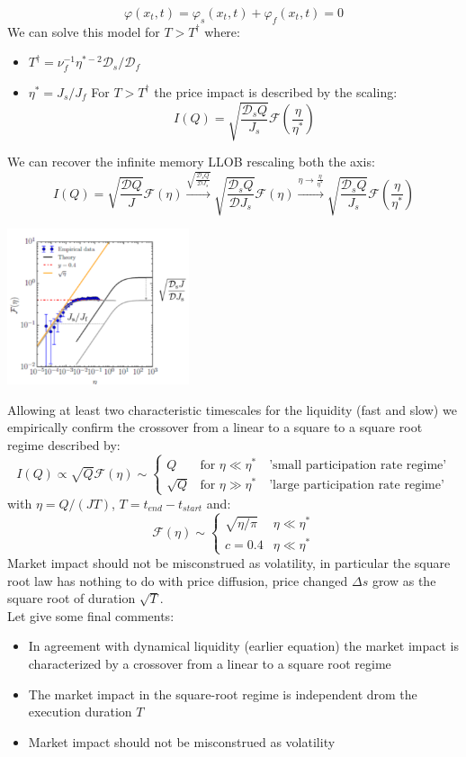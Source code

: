 \[
\varphi(x_t,t) = \varphi_s(x_t,t) + \varphi_f(x_t,t) = 0
\]
We can solve this model for $T > T^\dag$ where:
\begin{itemize}
	\item $T^\dag = \nu_f^{-1}\eta^{*-2}\mathcal{D}_s/\mathcal{D}_f$
	\item $\eta^* = J_s/J_f$
For $T > T^\dagger$ the price impact is described by the scaling:
\[
I(Q) = \sqrt{\frac{\mathcal{D}_sQ}{J_s}}\mathcal{F}\left(\frac{\eta}{\eta^*}\right)
\]
\end{itemize}
We can recover the infinite memory LLOB rescaling both the axis:
\[
I(Q) = \sqrt{\frac{\mathcal{D}Q}{J}} \mathcal{F}(\eta) \xrightarrow[]{\sqrt{\frac{\mathcal{D}_sQ}{\mathcal{D}J_s}}}\sqrt{\frac{\mathcal{D}_sQ}{\mathcal{D}J_s}} \mathcal{F}(\eta)\xrightarrow[]{\eta \to \frac{\eta}{\eta^*}} \sqrt{\frac{\mathcal{D}_sQ}{J_s}} \mathcal{F}\left(\frac{\eta}{\eta^*}\right)
\]
\begin{center}
	\includegraphics[width=0.4\textwidth]{picture/(37)fast_slow_llob.png}
\end{center}
Allowing at least two characteristic timescales for the liquidity (fast and slow) we empirically confirm the crossover from a linear to a square to a square root regime described by:
\[
I(Q) \propto \sqrt{Q} \mathcal{F}(\eta)\sim \begin{cases}
	Q & \text{for } \eta \ll \eta^* \quad \text{'small participation rate regime'}\\
	\sqrt{Q} & \text{for } \eta \gg \eta^* \quad \text{'large participation rate regime'}
\end{cases}
\]
with $\eta = Q/(JT)$, $T =t_{end} - t_{start}$ and:
\[
\mathcal{F}(\eta) \sim \begin{cases}
	\sqrt{\eta/\pi} & \eta \ll \eta^*\\
	c = 0.4 & \eta \ll \eta^*
\end{cases}
\]
Market impact should not be misconstrued as volatility, in particular the square root law has nothing to do with price diffusion, price changed $\Delta s$ grow as the square root of duration $\sqrt{T}$.\\
Let give some final comments:
\begin{itemize}
	\item In agreement with dynamical liquidity (earlier equation) the market impact is characterized by a crossover from a linear to a square root regime
	\item The market impact in the square-root regime is independent drom the execution duration $T$
	\item Market impact should not be misconstrued as volatility
\end{itemize}
